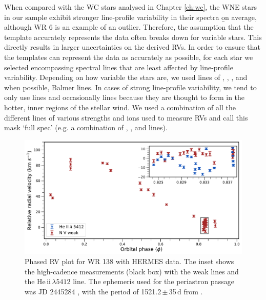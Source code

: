 When compared with the WC stars analysed in Chapter \ref{ch:wc}, the WNE stars in our sample exhibit stronger line-profile variability in their spectra \b{on average, although WR 6 is an example of an outlier}. Therefore, the assumption that the template accurately represents the data often breaks down for variable stars. This directly results in larger uncertainties on the derived RVs. In order to ensure that the templates can represent the data as accurately as possible, for each star we selected encompassing spectral lines that are least affected by line-profile variability. Depending on how variable the stars are, we used lines of \niv, \nv, \heii,{} and when possible, Balmer lines. In cases of strong line-profile variability, we tend to only use \nv{} lines and occasionally \niv{} lines because they are thought to form in the hotter, inner regions of the stellar wind. We used a combination of all the different lines of various strengths and ions used to measure RVs and call this mask `full spec' (e.g. a combination of \nv{}, \niv,{} and \heii{} lines).

\begin{figure}
    \centering
    \includegraphics[width=\textwidth]{chapters/WNE/image/WR138_nogrid.pdf}
    \caption{Phased RV plot for WR 138 with HERMES data. The inset shows the high-cadence measurements (black box) with the \nv{} weak lines and the He\,{\sc ii}\,$\lambda 5412$ line. The ephemeris used for the periastron passage was JD 2445284 \citep{1990Annuk}, with the period of 1521.2\,$\pm$\,35\,d from \citet{2013Palate}.}
    \label{fig:WR138_phased}
\end{figure}

